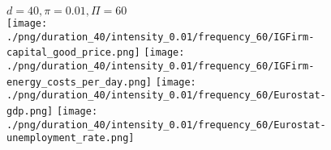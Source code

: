 \begin{figure}[ht!]
\centering\leavevmode
\begin{minipage}{13cm}
\centering\leavevmode
{$d=40, \pi=0.01, \Pi=60$}\\
\texttt{[image: ./png/duration\_40/intensity\_0.01/frequency\_60/IGFirm-capital\_good\_price.png]}
\texttt{[image: ./png/duration\_40/intensity\_0.01/frequency\_60/IGFirm-energy\_costs\_per\_day.png]}
\texttt{[image: ./png/duration\_40/intensity\_0.01/frequency\_60/Eurostat-gdp.png]}
\texttt{[image: ./png/duration\_40/intensity\_0.01/frequency\_60/Eurostat-unemployment\_rate.png]}
\end{minipage}
\end{figure}

